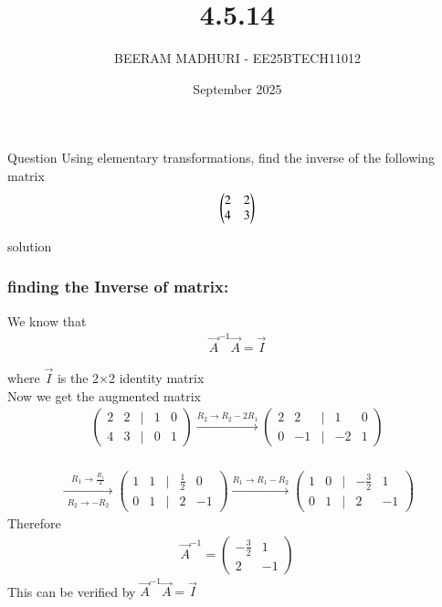 \documentclass{beamer}
\title %
{4.5.14}
\date{September  2025}
\author %
{BEERAM MADHURI - EE25BTECH11012}
\begin{document}
\frame{\titlepage}
\begin{frame}{Question}
 Using elementary transformations, find the inverse of the following matrix\\
\begin{align*}
\begin{pmatrix}
$2$ & $2$\\
$4$ & $3$
\end{pmatrix}
\end{align*}
\end{frame}
 

\begin{frame}{solution}
    \frametitle{finding the Inverse of matrix: }
We know that
\begin{align}
\vec{A}^{-1}\vec{A} = \vec{I} 
\end{align}

\text where $\vec{I}$ is the 2$\times$2 identity matrix\\
Now we get the augmented matrix\\
\begin{align}
\begin{pmatrix}2 & 2 & | & 1 & 0 \\4 & 3 & | & 0 & 1\end{pmatrix}\xrightarrow{R_2 \to R_2 -{2}R_1}\begin{pmatrix}2 & 2 & | & 1 & 0 \\0 & -1 & | & -{2} & 1\end{pmatrix}\\
\end{align}
\end{frame}
\begin{frame}
\begin{align}
\xrightarrow[\substack{R_2 \to -R_2}]{R_1 \to \frac{R_1}{2}}\begin{pmatrix}1 & 1 & | & \frac{1}{2} & 0 \\0 & 1 & | & {2} & -1\end{pmatrix}\xrightarrow{R_1 \to R_1 - R_2}\begin{pmatrix}1 & 0 & | & -\frac{3}{2} & 1 \\0 & 1 & | &{2} & -1\end{pmatrix}
\end{align}
Therefore
\begin{align}
\vec{A}^{-1} = \begin{pmatrix}-\frac{3}{2} & 1 \\{2} & -1\end{pmatrix}
\end{align}
This can be verified by $\vec{A}^{-1}\vec{A} = \vec{I}$
\end{frame}
\end{document}
